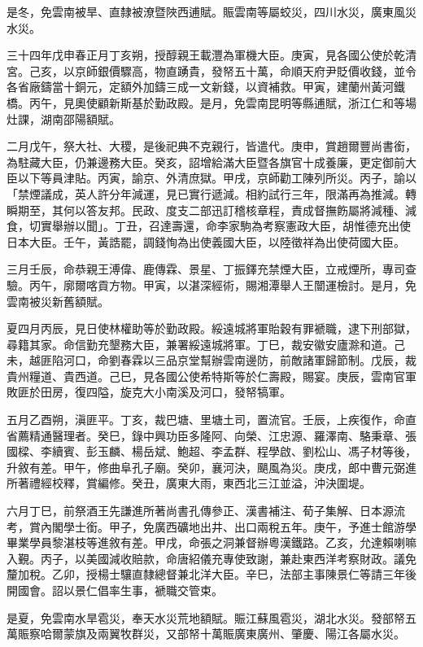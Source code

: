 \begin{pinyinscope}
是冬，免雲南被旱、直隸被潦暨陜西逋賦。賑雲南等屬蛟災，四川水災，廣東風災水災。

三十四年戊申春正月丁亥朔，授醇親王載灃為軍機大臣。庚寅，見各國公使於乾清宮。己亥，以京師銀價驟高，物直踴貴，發帑五十萬，命順天府尹貶價收錢，並令各省廠鑄當十銅元，定額外加鑄三成一文新錢，以資補救。甲寅，建蘭州黃河鐵橋。丙午，見奧使顧新斯基於勤政殿。是月，免雲南昆明等縣逋賦，浙江仁和等場灶課，湖南邵陽額賦。

二月戊午，祭大社、大稷，是後祀典不克親行，皆遣代。庚申，賞趙爾豐尚書銜，為駐藏大臣，仍兼邊務大臣。癸亥，詔增給滿大臣暨各旗官十成養廉，更定御前大臣以下等員津貼。丙寅，諭京、外清庶獄。甲戌，京師勸工陳列所災。丙子，諭以「禁煙議成，英人許分年減運，見已實行遞減。相約試行三年，限滿再為推減。轉瞬期至，其何以答友邦。民政、度支二部迅訂稽核章程，責成督撫飭屬將減種、減食，切實舉辦以聞」。丁丑，召達壽還，命李家駒為考察憲政大臣，胡惟德充出使日本大臣。壬午，黃誥罷，調錢恂為出使義國大臣，以陸徵祥為出使荷國大臣。

三月壬辰，命恭親王溥偉、鹿傳霖、景星、丁振鐸充禁煙大臣，立戒煙所，專司查驗。丙午，廓爾喀貢方物。甲寅，以湛深經術，賜湘潭舉人王闓運檢討。是月，免雲南被災新舊額賦。

夏四月丙辰，見日使林權助等於勤政殿。綏遠城將軍貽穀有罪褫職，逮下刑部獄，尋籍其家。命信勤充墾務大臣，兼署綏遠城將軍。丁巳，裁安徽安廬滁和道。己未，越匪陷河口，命劉春霖以三品京堂幫辦雲南邊防，前敵諸軍歸節制。戊辰，裁貴州糧道、貴西道。己巳，見各國公使希特斯等於仁壽殿，賜宴。庚辰，雲南官軍敗匪於田房，復四隘，旋克大小南溪及河口，發帑犒軍。

五月乙酉朔，滇匪平。丁亥，裁巴塘、里塘土司，置流官。壬辰，上疾復作，命直省薦精通醫理者。癸巳，錄中興功臣多隆阿、向榮、江忠源、羅澤南、駱秉章、張國樑、李續賓、彭玉麟、楊岳斌、鮑超、李孟群、程學啟、劉松山、馮子材等後，升敘有差。甲午，修曲阜孔子廟。癸卯，襄河決，颶風為災。庚戌，郎中曹元弼進所著禮經校釋，賞編修。癸丑，廣東大雨，東西北三江並溢，沖決圍堤。

六月丁巳，前祭酒王先謙進所著尚書孔傳參正、漢書補注、荀子集解、日本源流考，賞內閣學士銜。甲子，免廣西礦地出井、出口兩稅五年。庚午，予進士館游學畢業學員黎湛枝等進敘有差。甲戌，命張之洞兼督辦粵漢鐵路。乙亥，允達賴喇嘛入覲。丙子，以美國減收賠款，命唐紹儀充專使致謝，兼赴東西洋考察財政。議免釐加稅。乙卯，授楊士驤直隸總督兼北洋大臣。辛巳，法部主事陳景仁等請三年後開國會。詔以景仁倡率生事，褫職交管束。

是夏，免雲南水旱雹災，奉天水災荒地額賦。賑江蘇風雹災，湖北水災。發部帑五萬賑察哈爾蒙旗及兩翼牧群災，又部帑十萬賑廣東廣州、肇慶、陽江各屬水災。


\end{pinyinscope}
